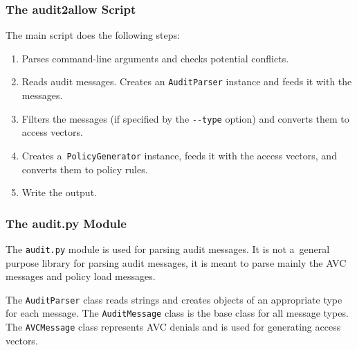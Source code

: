 \subsubsection{The audit2allow Script}

The main script does the following steps:
\begin{enumerate}
    \item Parses command-line arguments and checks potential conflicts.
    \item Reads audit messages. Creates an \texttt{AuditParser} instance and
        feeds it with the messages.
    \item Filters the messages (if specified by the \texttt{-{}-type} option)
        and converts them to access vectors.
    \item Creates a~\texttt{PolicyGenerator} instance, feeds it with the access
        vectors, and converts them to policy rules.
    \item Write the output.
\end{enumerate}

\subsubsection{The audit.py Module}

The \texttt{audit.py} module is used for parsing audit messages. It is not
a~general purpose library for parsing audit messages, it is meant to parse
mainly the AVC messages and policy load messages.

The \texttt{AuditParser} class reads strings and creates objects of an
appropriate type for each message. The \texttt{AuditMessage} class is the base
class for all message types. The \texttt{AVCMessage} class represents AVC
denials and is used for generating access vectors.


